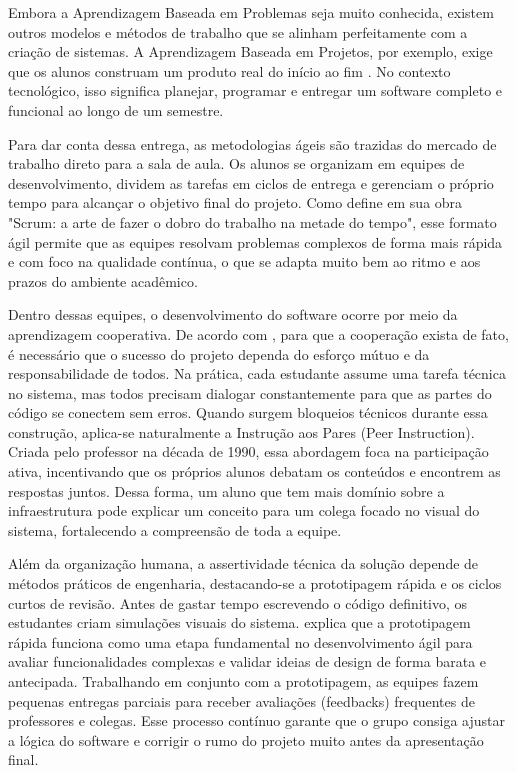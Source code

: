Embora a Aprendizagem Baseada em Problemas seja muito conhecida, existem outros
modelos e métodos de trabalho que se alinham perfeitamente com a criação de
sistemas. A Aprendizagem Baseada em Projetos, por exemplo, exige que os alunos
construam um produto real do início ao fim
\cite{ribeiro2025interdisciplinaridade}. No contexto tecnológico, isso
significa planejar, programar e entregar um software completo e funcional ao
longo de um semestre.

Para dar conta dessa entrega, as metodologias ágeis são trazidas do mercado de
trabalho direto para a sala de aula. Os alunos se organizam em equipes de
desenvolvimento, dividem as tarefas em ciclos de entrega e gerenciam o próprio
tempo para alcançar o objetivo final do projeto. Como define
 em sua obra "Scrum: a arte de fazer o dobro do
trabalho na metade do tempo", esse formato ágil permite que as equipes resolvam
problemas complexos de forma mais rápida e com foco na qualidade contínua, o
que se adapta muito bem ao ritmo e aos prazos do ambiente acadêmico.

Dentro dessas equipes, o desenvolvimento do software ocorre por meio da
aprendizagem cooperativa. De acordo com , para
que a cooperação exista de fato, é necessário que o sucesso do projeto dependa
do esforço mútuo e da responsabilidade de todos. Na prática, cada estudante
assume uma tarefa técnica no sistema, mas todos precisam dialogar
constantemente para que as partes do código se conectem sem erros. Quando
surgem bloqueios técnicos durante essa construção, aplica-se naturalmente a
Instrução aos Pares (Peer Instruction). Criada pelo professor
 na década de 1990, essa abordagem foca na
participação ativa, incentivando que os próprios alunos debatam os conteúdos e
encontrem as respostas juntos. Dessa forma, um aluno que tem mais domínio sobre
a infraestrutura pode explicar um conceito para um colega focado no visual do
sistema, fortalecendo a compreensão de toda a equipe.

Além da organização humana, a assertividade técnica da solução depende de
métodos práticos de engenharia, destacando-se a prototipagem rápida e os ciclos
curtos de revisão. Antes de gastar tempo escrevendo o código definitivo, os
estudantes criam simulações visuais do sistema.
 explica que a prototipagem rápida
funciona como uma etapa fundamental no desenvolvimento ágil para avaliar
funcionalidades complexas e validar ideias de design de forma barata e
antecipada. Trabalhando em conjunto com a prototipagem, as equipes fazem
pequenas entregas parciais para receber avaliações (feedbacks) frequentes de
professores e colegas. Esse processo contínuo garante que o grupo consiga
ajustar a lógica do software e corrigir o rumo do projeto muito antes da
apresentação final.


